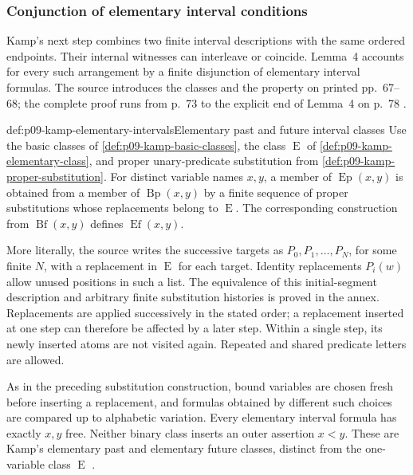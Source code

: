 
\subsubsection{Conjunction of elementary interval conditions}
\label{sec:p09-kamp-iii2-lemma4}

Kamp's next step combines two finite interval descriptions with the same
ordered endpoints. Their internal witnesses can interleave or coincide.
Lemma~4 accounts for every such arrangement by a finite disjunction of
elementary interval formulas. The source introduces the classes and the
property on printed pp.~67--68; the complete proof runs from p.~73 to the
explicit end of Lemma~4 on p.~78 \cite[ch.~III, pp.~67--68, 73--78]{Kamp1968}.

\begin{hbdefinition}{def:p09-kamp-elementary-intervals}{Elementary past and future interval classes}
Use the basic classes of \cref{def:p09-kamp-basic-classes}, the class
\(\operatorname{E}\) of \cref{def:p09-kamp-elementary-class}, and proper
unary-predicate substitution from \cref{def:p09-kamp-proper-substitution}.
For distinct variable names \(x,y\), a member of
\(\operatorname{Ep}(x,y)\) is obtained from a member of
\(\operatorname{Bp}(x,y)\) by a finite sequence of proper substitutions
whose replacements belong to \(\operatorname{E}\). The corresponding
construction from \(\operatorname{Bf}(x,y)\) defines
\(\operatorname{Ef}(x,y)\).

More literally, the source writes the successive targets as
\(P_0,P_1,\ldots,P_N\), for some finite \(N\), with a replacement in
\(\operatorname{E}\) for each target. Identity replacements
\(P_i(w)\) allow unused positions in such a list. The equivalence of this
initial-segment description and arbitrary finite substitution histories is
proved in the annex. Replacements are applied successively in the stated
order; a replacement inserted at one step can therefore be affected by a
later step. Within a single step, its newly inserted atoms are not visited
again. Repeated and shared predicate letters are allowed.

As in the preceding substitution construction, bound variables are chosen
fresh before inserting a replacement, and formulas obtained by different
such choices are compared up to alphabetic variation. Every elementary
interval formula has exactly \(x,y\) free. Neither binary class inserts
an outer assertion \(x<y\).
These are Kamp's elementary past and elementary future classes, distinct
from the one-variable class \(\operatorname{E}\)
\cite[ch.~III, p.~67]{Kamp1968}.
\end{hbdefinition}


